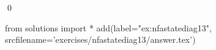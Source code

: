 
\begin{ex} 
  \label{ex:nfastatediag13}
  
  \qed
\end{ex} 
\begin{python0}
from solutions import *
add(label="ex:nfastatediag13",
    srcfilename='exercises/nfastatediag13/answer.tex') 
\end{python0}
